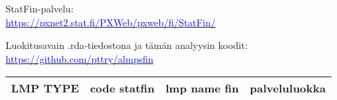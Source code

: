 \documentclass[12pt]{article}
\begin{document}
\vspace{1cm} 
\noindent StatFin-palvelu: \\ \footnotesize\href{https://pxnet2.stat.fi/PXWeb/pxweb/fi/StatFin/}{\textcolor{blue}{https://pxnet2.stat.fi/PXWeb/pxweb/fi/StatFin/}}\normalsize

\vspace{1cm}
\noindent Luokitusavain .rda-tiedostona ja tämän analyysin koodit: \\  \footnotesize\href{https://github.com/pttry/almpsfin}{\textcolor{blue}{https://github.com/pttry/almpsfin}}\normalsize
\begin{table}[b]
\footnotesize
\centering
\begin{tabular}{l|l|l|l}
LMP TYPE & code statfin & lmp name fin & palveluluokka \\ \hline


\end{tabular}
\end{table}
\end{document}
